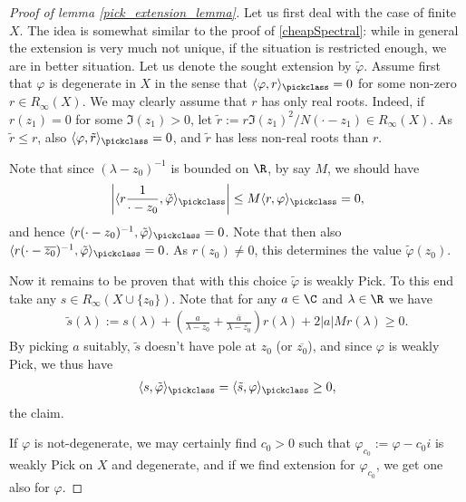 \begin{proof}[Proof of lemma \ref{pick_extension_lemma}]
	Let us first deal with the case of finite $X$. The idea is somewhat similar to the proof of \ref{cheapSpectral}: while in general the extension is very much not unique, if the situation is restricted enough, we are in better situation. Let us denote the sought extension by $\tilde{\varphi}$. Assume first that $\varphi$ is degenerate in $X$ in the sense that $\langle \varphi, r\rangle_{\pickclass} = 0$ for some non-zero $r \in R_{\infty}(X)$. We may clearly assume that $r$ has only real roots. Indeed, if $r(z_{1}) = 0$ for some $\Im(z_{1}) > 0$, let $\tilde{r} := r \Im(z_{1})^2/N(\cdot - z_{1}) \in R_{\infty}(X)$. As $\tilde{r} \leq r$, also  $\langle \varphi, \tilde{r}\rangle_{\pickclass} = 0$, and $\tilde{r}$ has less non-real roots than $r$.

	Note that since $(\lambda - z_{0})^{-1}$ is bounded on $\R$, by say $M$, we should have
	\begin{align*}
		\left|\langle r \frac{1}{\cdot - z_{0}}, \tilde{\varphi} \rangle_{\pickclass}\right| \leq M \langle r , \varphi \rangle_{\pickclass} = 0,
	\end{align*}
	and hence $\langle r (\cdot - z_{0})^{-1}, \tilde{\varphi} \rangle_{\pickclass} = 0$. Note that then also $\langle r (\cdot - \overline{z_{0}})^{-1}, \tilde{\varphi} \rangle_{\pickclass} = 0$. As $r(z_{0}) \neq 0$, this determines the value $\tilde{\varphi}(z_{0})$.

	Now it remains to be proven that with this choice $\tilde{\varphi}$ is weakly Pick. To this end take any $s \in R_{\infty}(X \cup \{z_{0}\})$. Note that for any $a \in \C$ and $\lambda \in \R$ we have
	\begin{align*}
		\tilde{s}(\lambda) := s(\lambda) + \left(\frac{a}{\lambda - z_{0}} + \frac{\overline{a}}{\lambda - \overline{z_{0}}}\right) r(\lambda) + 2 |a| M r(\lambda) \geq 0.
	\end{align*}
	By picking $a$ suitably, $\tilde{s}$ doesn't have pole at $z_{0}$ (or $\overline{z_{0}}$), and since $\varphi$ is weakly Pick, we thus have
	\begin{align*}
		\langle s, \tilde{\varphi} \rangle_{\pickclass} = \langle \tilde{s}, \varphi \rangle_{\pickclass} \geq 0,
	\end{align*}
	the claim.

	If $\varphi$ is not-degenerate, we may certainly find $c_{0} > 0$ such that $\varphi_{c_{0}} := \varphi - c_{0} i$ is weakly Pick on $X$ and degenerate, and if we find extension for $\varphi_{c_{0}}$, we get one also for $\varphi$.


\end{proof}
